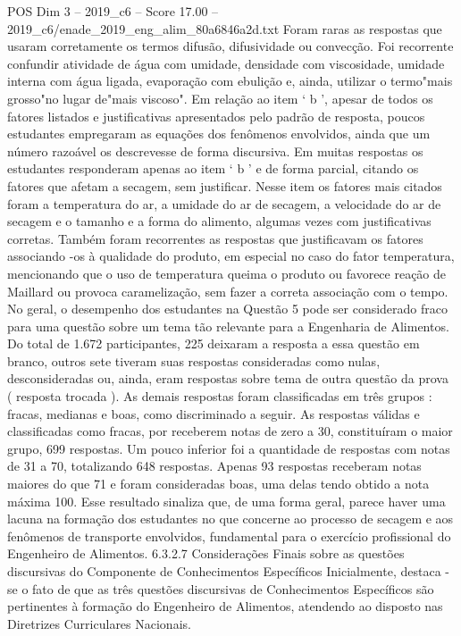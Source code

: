 \begin{textsample}{POS Dim 3 – 2019\_c6 – Score 17.00 – 2019\_c6/enade\_2019\_eng\_alim\_80a6846a2d.txt}
Foram raras as respostas que usaram corretamente os termos difusão, difusividade ou convecção.
Foi recorrente confundir atividade de água com umidade, densidade com viscosidade, umidade interna com água ligada, evaporação com ebulição e, ainda, utilizar o termo"mais grosso"no lugar de"mais viscoso".
Em relação ao item ‘ b ’, apesar de todos os fatores listados e justificativas apresentados pelo padrão de resposta, poucos estudantes empregaram as equações dos fenômenos envolvidos, ainda que um número razoável os descrevesse de forma discursiva.
Em muitas respostas os estudantes responderam apenas ao item ‘ b ’ e de forma parcial, citando os fatores que afetam a secagem, sem justificar.
Nesse item os fatores mais citados foram a temperatura do ar, a umidade do ar de secagem, a velocidade do ar de secagem e o tamanho e a forma do alimento, algumas vezes com justificativas corretas.
Também foram recorrentes as respostas que justificavam os fatores associando -os à qualidade do produto, em especial no caso do fator temperatura, mencionando que o uso de temperatura queima o produto ou favorece reação de Maillard ou provoca caramelização, sem fazer a correta associação com o tempo.
No geral, o desempenho dos estudantes na Questão 5 pode ser considerado fraco para uma questão sobre um tema tão relevante para a Engenharia de Alimentos.
Do total de 1.672 participantes, 225 deixaram a resposta a essa questão em branco, outros sete tiveram suas respostas consideradas como nulas, desconsideradas ou, ainda, eram respostas sobre tema de outra questão da prova ( resposta trocada ).
As demais respostas foram classificadas em três grupos : fracas, medianas e boas, como discriminado a seguir.
As respostas válidas e classificadas como fracas, por receberem notas de zero a 30, constituíram o maior grupo, 699 respostas.
Um pouco inferior foi a quantidade de respostas com notas de 31 a 70, totalizando 648 respostas.
Apenas 93 respostas receberam notas maiores do que 71 e foram consideradas boas, uma delas tendo obtido a nota máxima 100.
Esse resultado sinaliza que, de uma forma geral, parece haver uma lacuna na formação dos estudantes no que concerne ao processo de secagem e aos fenômenos de transporte envolvidos, fundamental para o exercício profissional do Engenheiro de Alimentos. 6.3.2.7 Considerações Finais sobre as questões discursivas do Componente de Conhecimentos Específicos Inicialmente, destaca -se o fato de que as três questões discursivas de Conhecimentos Específicos são pertinentes à formação do Engenheiro de Alimentos, atendendo ao disposto nas Diretrizes Curriculares Nacionais.

\end{textsample}
